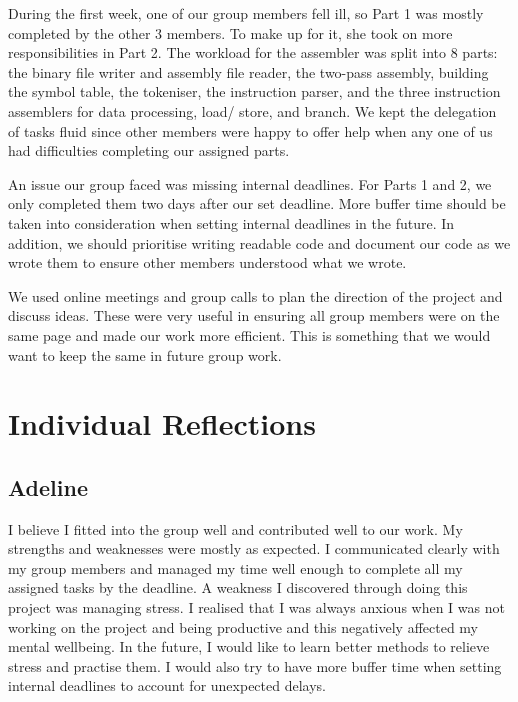 \documentclass[11pt]{article}
\begin{document}
During the first week, one of our group members fell ill, so Part 1 was mostly completed by the other 3 members. To make up for it, she took on more responsibilities in Part 2. The workload for the assembler was split into 8 parts: the binary file writer and assembly file reader, the two-pass assembly, building the symbol table, the tokeniser, the instruction parser, and the three instruction assemblers for data processing, load/ store, and branch. We kept the delegation of tasks fluid since other members were happy to offer help when any one of us had difficulties completing our assigned parts.

An issue our group faced was missing internal deadlines. For Parts 1 and 2, we only completed them two days after our set deadline. More buffer time should be taken into consideration when setting internal deadlines in the future. In addition, we should prioritise writing readable code and document our code as we wrote them to ensure other members understood what we wrote. 

We used online meetings and group calls to plan the direction of the project and discuss ideas. These were very useful in ensuring all group members were on the same page and made our work more efficient. This is something that we would want to keep the same in future group work.

\section{Individual Reflections}

\subsection{Adeline}
I believe I fitted into the group well and contributed well to our work. My strengths and weaknesses were mostly as expected. I communicated clearly with my group members and managed my time well enough to complete all my assigned tasks by the deadline. A weakness I discovered through doing this project was managing stress. I realised that I was always anxious when I was not working on the project and being productive and this negatively affected my mental wellbeing. In the future, I would like to learn better methods to relieve stress and practise them. I would also try to have more buffer time when setting internal deadlines to account for unexpected delays. 
\end{document}
